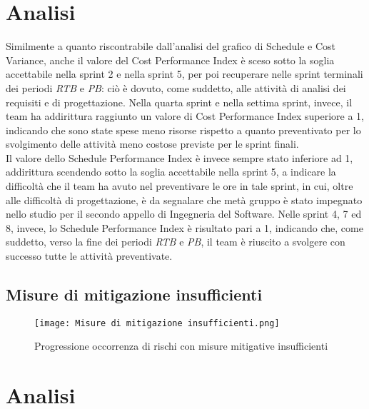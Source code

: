 \section*{Analisi}

Similmente a quanto riscontrabile dall’analisi del grafico di Schedule e Cost Variance, anche
il valore del Cost Performance Index è sceso sotto la soglia accettabile nella 
sprint 2 e nella sprint 5, per poi recuperare nelle sprint terminali dei periodi \emph{RTB} e \emph{PB}: ciò è dovuto, come suddetto, alle attività di analisi dei requisiti e di progettazione. Nella quarta sprint e nella settima sprint, invece, il team
ha addirittura raggiunto un valore di Cost Performance Index superiore a 1, indicando
che sono state spese meno risorse rispetto a quanto preventivato per lo svolgimento delle
attività meno costose previste per le sprint finali.\\
Il valore dello Schedule Performance Index è invece sempre stato inferiore ad 1, addirittura scendendo sotto la soglia accettabile nella sprint 5, a indicare la difficoltà che il team ha avuto nel preventivare le ore in tale sprint, in cui, oltre alle difficoltà di progettazione, è da segnalare che metà gruppo è stato impegnato nello studio per il secondo appello di Ingegneria del Software.
Nelle sprint 4, 7 ed 8, invece, lo Schedule Performance Index è risultato pari a 1, indicando che, come suddetto, verso la fine dei periodi \emph{RTB} e \emph{PB}, il team è riuscito a svolgere
con successo tutte le attività preventivate.

\newpage

\subsection{Misure di mitigazione insufficienti}
\label{subsec:Misure di mitigazione insufficienti}

\begin{figure}[h] 
    \centering
    \texttt{[image: Misure di mitigazione insufficienti.png]}
    \caption{Progressione occorrenza di rischi con misure mitigative insufficienti} 
    \label{fig: Misure di mitigazione insufficienti}
\end{figure}

\section*{Analisi}


